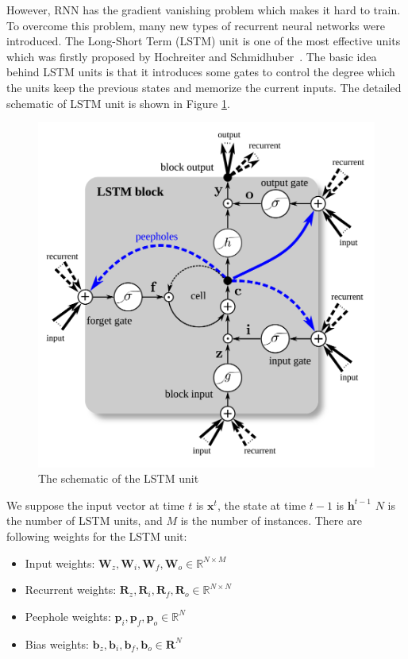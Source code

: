 However, RNN has the gradient vanishing problem which makes it hard to train. To overcome this problem, many new types of recurrent neural networks were introduced. The Long-Short Term (LSTM) unit is one of the most effective units which was firstly proposed by Hochreiter and Schmidhuber~\cite{hochreiter1997long}. The basic idea behind LSTM units is that it introduces some gates to control the degree which the units keep the previous states and memorize the current inputs. The detailed schematic of LSTM unit is shown in Figure \ref{lstm}.
\begin{figure}
\centering
\caption{The schematic of the LSTM unit~\cite{Greff2017}}
\label{lstm}
\includegraphics{lstm.png}
\end{figure}

We suppose the input vector at time $t$ is $\mathbf{x}^t$, the state at time $t-1$ is $\mathbf{h}^{t-1}$ $N$ is the number of LSTM units, and $M$ is the number of instances. There are following weights for the LSTM unit:
\begin{itemize}
	\item Input weights: $\mathbf{W}_z, \mathbf{W}_i, \mathbf{W}_f, \mathbf{W}_o \in \mathbb{R} ^{N\times M} $
	\item Recurrent weights: $\mathbf{R}_z, \mathbf{R}_i, \mathbf{R}_f, \mathbf{R}_o \in \mathbb{R}^{N\times N}$
	\item Peephole weights: $\mathbf{p}_i, \mathbf{p}_f, \mathbf{p}_o \in \mathbb{R}^{N}$
	\item Bias weights: $\mathbf{b}_z,\mathbf{b}_i, \mathbf{b}_f, \mathbf{b}_o \in \mathbf{R}^{N} $
\end{itemize}

